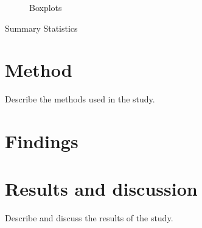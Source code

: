 \documentclass{article}
\begin{document}
\begin{figure}[htbp]
	\centering
	
	\caption{Boxplots}
\end{figure}




\begin{table}[H]
	
	\caption{Summary Statistics}
\end{table}

\section{Method}
Describe the methods used in the study.

\section{Findings}

\begin{figure}[htbp]
	\centering
	
	\caption{}
\end{figure}

\begin{figure}[htbp]
	\centering
	
	\caption{}
\end{figure}

\begin{figure}[htbp]
	\centering
	
	\caption{}
\end{figure}


\section{Results and discussion}
Describe and discuss the results of the study.


\theendnotes



\end{document}
